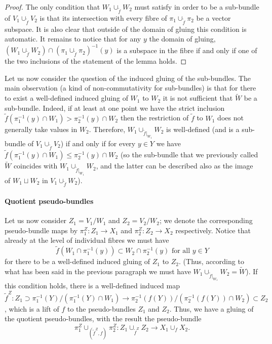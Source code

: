 \documentclass{article}
\begin{document}
\begin{proof}
The only condition that $W_1\cup_{\tilde{f}}W_2$ must satisfy in order to be a sub-bundle of $V_1\cup_{\tilde{f}}V_2$ is that its intersection with every fibre of $\pi_1\cup_{\tilde{f}}\pi_2$ be a vector subspace. 
It is also clear that outside of the domain of gluing this condition is automatic. It remains to notice that for any $y$ the domain of gluing, $(W_1\cup_{\tilde{f}}W_2)\cap(\pi_1\cup_{\tilde{f}}\pi_2)^{-1}(y)$ is a 
subspace in the fibre if and only if one of the two inclusions of the statement of the lemma holds.
\end{proof}

Let us now consider the question of the induced gluing of the sub-bundles. The main observation (a kind of non-commutativity for sub-bundles) is that for there to exist a well-defined induced gluing of 
$W_1$ to $W_2$ it is not sufficient that $\tilde{W}$ be a sub-bundle. Indeed, if at least at one point we have the strict inclusion $\tilde{f}(\pi_1^{-1}(y)\cap W_1)>\pi_2^{-1}(y)\cap W_2$ then the restriction 
of $\tilde{f}$ to $W_1$ does not generally take values in $W_2$. Therefore, $W_1\cup_{\tilde{f}|_{W_1}}W_2$ is well-defined (and is a sub-bundle of $V_1\cup_{\tilde{f}}V_2$) if and only if for every 
$y\in Y$ we have $\tilde{f}(\pi_1^{-1}(y)\cap W_1)\leqslant\pi_2^{-1}(y)\cap W_2$ (so the sub-bundle that we previously called $\tilde{W}$ coincides with $W_1\cup_{\tilde{f}|_{W_1}}W_2$, and the latter can 
be described also as the image of $W_1\sqcup W_2$ in $V_1\cup_{\tilde{f}}W_2$).

\paragraph{Quotient pseudo-bundles} Let us now consider $Z_1=V_1/W_1$ and $Z_2=V_2/W_2$; we denote the corresponding pseudo-bundle maps by $\pi_1^Z:Z_1\to X_1$ and $\pi_2^Z:Z_2\to X_2$
respectively. Notice that already at the level of individual fibres we must have
$$\tilde{f}(W_1\cap\pi_1^{-1}(y))\subset W_2\cap\pi_2^{-1}(y)\mbox{ for all }y\in Y$$ for there to be a well-defined induced gluing of $Z_1$ to $Z_2$. (Thus, according to what has been said in the previous 
paragraph we must have $W_1\cup_{\tilde{f}|_{W_1}}W_2=\tilde{W}$). If this condition holds, there is a well-defined induced map 
$\tilde{f}^Z:Z_1\supset\pi_1^{-1}(Y)/\left(\pi_1^{-1}(Y)\cap W_1\right)\to\pi_2^{-1}(f(Y))/\left(\pi_2^{-1}(f(Y))\cap W_2\right)\subset Z_2$, which is a lift of $f$ to the pseudo-bundles $Z_1$ and $Z_2$. Thus, we 
have a gluing of the quotient pseudo-bundles, with the result the pseudo-bundle
$$\pi_1^Z\cup_{(\tilde{f}^Z,f)}\pi_2^Z:Z_1\cup_{\tilde{f}^Z}Z_2\to X_1\cup_f X_2.$$
\end{document}
